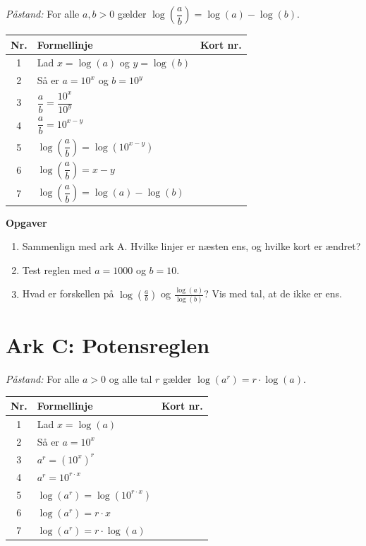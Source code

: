 \documentclass[a4paper,11pt]{article}
\begin{document}
\emph{Påstand:} For alle \(a,b>0\) gælder \(\log\left(\dfrac ab\right)=\log(a)-\log(b)\).

\begin{center}
\begin{tabular}{|c|l|p{3cm}|}
\hline
Nr. & Formellinje & Kort nr.\\
\hline
1 & Lad \(x=\log(a)\) og \(y=\log(b)\) & \\
2 & Så er \(a=10^x\) og \(b=10^y\) & \\
3 & \(\dfrac ab=\dfrac{10^x}{10^y}\) & \\
4 & \(\dfrac ab=10^{x-y}\) & \\
5 & \(\log\left(\dfrac ab\right)=\log(10^{x-y})\) & \\
6 & \(\log\left(\dfrac ab\right)=x-y\) & \\
7 & \(\log\left(\dfrac ab\right)=\log(a)-\log(b)\) & \\
\hline
\end{tabular}
\end{center}

\textbf{Opgaver}
\begin{enumerate}
\item Sammenlign med ark A. Hvilke linjer er næsten ens, og hvilke kort er ændret?
\item Test reglen med \(a=1000\) og \(b=10\).
\item Hvad er forskellen på \(\log\left(\frac ab\right)\) og \(\frac{\log(a)}{\log(b)}\)? Vis med tal, at de ikke er ens.
\end{enumerate}

\newpage
\section*{Ark C: Potensreglen}
\label{sec:orge8d390a}

\emph{Påstand:} For alle \(a>0\) og alle tal \(r\) gælder \(\log(a^r)=r\cdot\log(a)\).

\begin{center}
\begin{tabular}{|c|l|p{3cm}|}
\hline
Nr. & Formellinje & Kort nr.\\
\hline
1 & Lad \(x=\log(a)\) & \\
2 & Så er \(a=10^x\) & \\
3 & \(a^r=(10^x)^r\) & \\
4 & \(a^r=10^{r\cdot x}\) & \\
5 & \(\log(a^r)=\log(10^{r\cdot x})\) & \\
6 & \(\log(a^r)=r\cdot x\) & \\
7 & \(\log(a^r)=r\cdot\log(a)\) & \\
\hline
\end{tabular}
\end{center}
\end{document}
